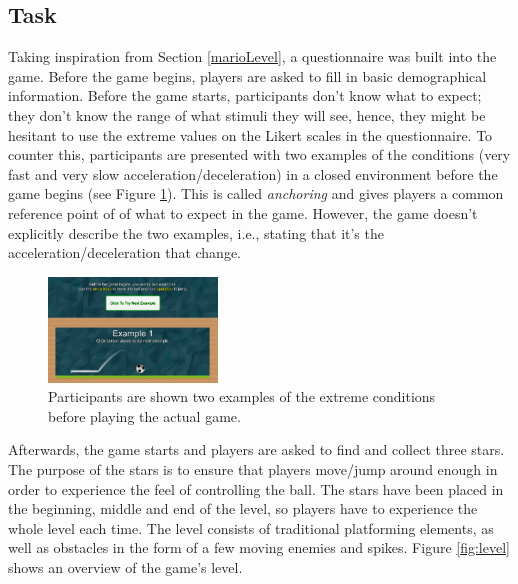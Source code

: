 
\subsection{Task} \label{task}
Taking inspiration from Section \ref{marioLevel}, a questionnaire was built into the game. Before the game begins, players are asked to fill in basic demographical information. Before the game starts, participants don't know what to expect; they don't know the range of what stimuli they will see, hence, they might be hesitant to use the extreme values on the Likert scales in the questionnaire. To counter this, participants are presented with two examples of the conditions (very fast and very slow acceleration/deceleration) in a closed environment before the game begins (see Figure \ref{fig:example}). This is called \textit{anchoring} \cite{cunningham} and gives players a common reference point of of what to expect in the game. However, the game doesn't explicitly describe the two examples, i.e., stating that it's the acceleration/deceleration that change.

\begin{figure}[htbp]
\centering
\includegraphics[width=0.4\textwidth]{Pics/example}
\caption{Participants are shown two examples of the extreme conditions before playing the actual game.}
\label{fig:example}
\end{figure}

Afterwards, the game starts and players are asked to find and collect three stars. The purpose of the stars is to ensure that players move/jump around enough in order to experience the feel of controlling the ball. The stars have been placed in the beginning, middle and end of the level, so players have to experience the whole level each time. The level consists of traditional platforming elements, as well as obstacles in the form of a few moving enemies and spikes. Figure \ref{fig:level} shows an overview of the game's level.

